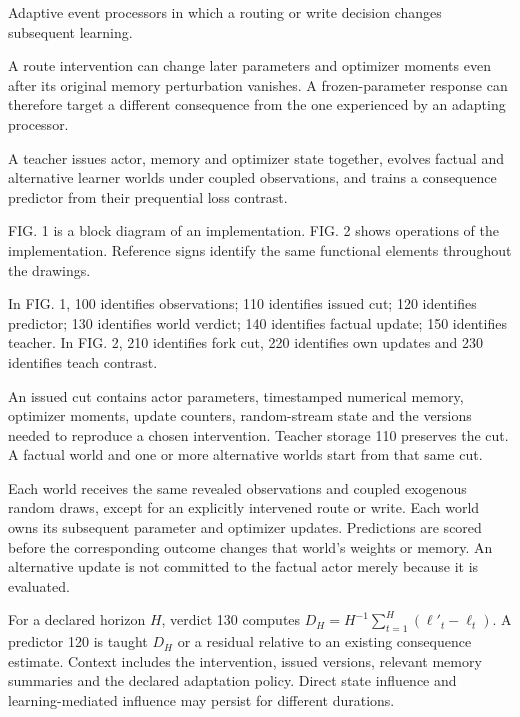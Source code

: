 \documentclass[pct]{sm-patent}
\begin{document}
\descriptionstart


\pnum Adaptive event processors in which a routing or write decision changes subsequent learning.


\pnum A route intervention can change later parameters and optimizer moments even after its original memory perturbation vanishes. A frozen-parameter response can therefore target a different consequence from the one experienced by an adapting processor.


\pnum A teacher issues actor, memory and optimizer state together, evolves factual and alternative learner worlds under coupled observations, and trains a consequence predictor from their prequential loss contrast.


\pnum FIG. 1 is a block diagram of an implementation. FIG. 2 shows operations of the implementation. Reference signs identify the same functional elements throughout the drawings.


\pnum In FIG. 1, 100 identifies observations; 110 identifies issued cut; 120 identifies predictor; 130 identifies world verdict; 140 identifies factual update; 150 identifies teacher. In FIG. 2, 210 identifies fork cut, 220 identifies own updates and 230 identifies teach contrast.

\pnum An issued cut contains actor parameters, timestamped numerical memory, optimizer moments, update counters, random-stream state and the versions needed to reproduce a chosen intervention. Teacher storage 110 preserves the cut. A factual world and one or more alternative worlds start from that same cut.

\pnum Each world receives the same revealed observations and coupled exogenous random draws, except for an explicitly intervened route or write. Each world owns its subsequent parameter and optimizer updates. Predictions are scored before the corresponding outcome changes that world's weights or memory. An alternative update is not committed to the factual actor merely because it is evaluated.

\pnum For a declared horizon $H$, verdict 130 computes $D_H=H^{-1}\sum_{t=1}^H(\ell'_t-\ell_t)$. A predictor 120 is taught $D_H$ or a residual relative to an existing consequence estimate. Context includes the intervention, issued versions, relevant memory summaries and the declared adaptation policy. Direct state influence and learning-mediated influence may persist for different durations.
\end{document}
